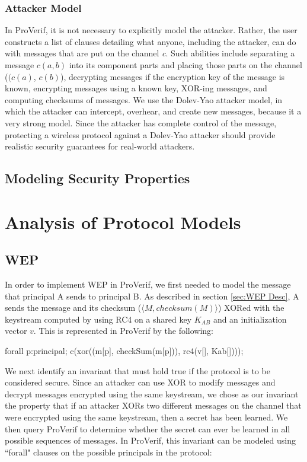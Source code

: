 \documentclass[11pt, twocolumn]{article} %
\begin{document}
{\subsubsection{Attacker Model}
In ProVerif, it is not necessary to explicitly model the attacker.  Rather, the user constructs a list of clauses detailing what anyone, including the attacker, can do with messages that are put on the channel \textit{c}.  Such abilities include separating a message $c(a,b)$ into its component parts and placing those parts on the channel ($(c(a)$, $c(b)$), decrypting messages if the encryption key of the message is known, encrypting messages using a known key, XOR-ing messages, and computing checksums of messages.  We use the Dolev-Yao attacker model, in which the attacker can intercept, overhear, and create new messages, because it a very strong model.  Since the attacker has complete control of the message, protecting a wireless protocol against a Dolev-Yao attacker should provide realistic security guarantees for real-world attackers. 

\subsection{Modeling Security Properties}

\section{Analysis of Protocol Models}
\label{sec:analysis}
\subsection{WEP}
In order to implement WEP in ProVerif, we first needed to model the message that principal A sends to principal B.  As described in section \ref{sec:WEP Desc}, A sends the message and its checksum ($\langle M, checksum(M)\rangle$) XORed with the keystream computed by using RC4 on a shared key $K_{AB}$ and an initialization vector $v$.  This is represented in ProVerif by the following:
\begin{verbatimtab}[4]
forall p:principal; 
	c(xor((m[p], checkSum(m[p])), 
		rc4(v[], Kab[])));
\end{verbatimtab}


We next identify an invariant that must hold true if the protocol is to be considered secure.  Since an attacker can use XOR to modify messages and decrypt messages encrypted using the same keystream, we chose as our invariant the property that if an attacker XORs two different messages on the channel that were encrypted using the same keystream, then a secret has been learned.  We then query ProVerif to determine whether the secret can ever be learned in all possible sequences of messages.  In ProVerif, this invariant can be modeled using ``forall" clauses on the possible principals in the protocol:

}
\end{document}
